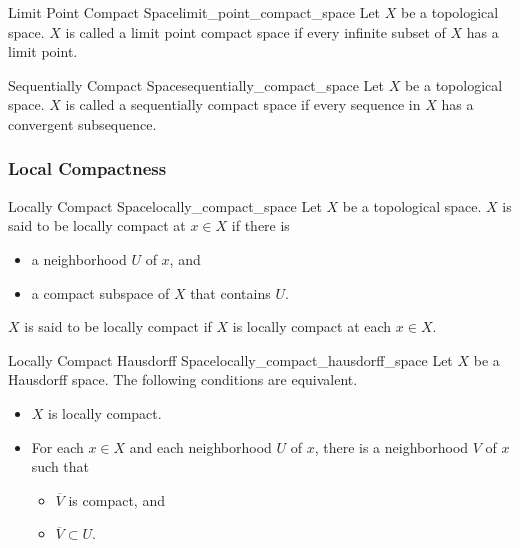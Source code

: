 \documentclass{article}
\begin{document}
\begin{definition}{Limit Point Compact Space}{limit_point_compact_space}
    Let $X$ be a topological space.
    $X$ is called a limit point compact space if every infinite subset of $X$ has a limit point.
\end{definition}

\begin{definition}{Sequentially Compact Space}{sequentially_compact_space}
    Let $X$ be a topological space.
    $X$ is called a sequentially compact space if every sequence in $X$ has a convergent subsequence.
\end{definition}

\subsubsection{Local Compactness}

\begin{definition}{Locally Compact Space}{locally_compact_space}
    Let $X$ be a topological space.
    $X$ is said to be locally compact at $x\in X$ if there is
    \begin{itemize}
        \item a neighborhood $U$ of $x$, and
        \item a compact subspace of $X$ that contains $U$.
    \end{itemize}
    $X$ is said to be locally compact if $X$ is locally compact at each $x\in X$.
\end{definition}

\begin{theorem}{Locally Compact Hausdorff Space}{locally_compact_hausdorff_space}
    Let $X$ be a Hausdorff space.
    The following conditions are equivalent.
    \begin{itemize}
        \item $X$ is locally compact.
        \item For each $x\in X$ and each neighborhood $U$ of $x$, there is a neighborhood $V$ of $x$ such that
        \begin{itemize}
            \item $\overline{V}$ is compact, and
            \item $\overline{V}\subset U$.
        \end{itemize}
    \end{itemize}
\end{theorem}
\end{document}
